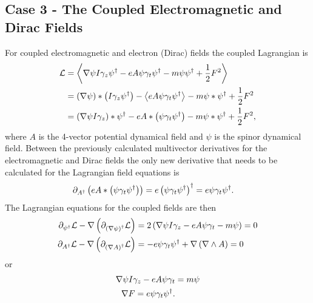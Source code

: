 \subsection{Case 3 - The Coupled Electromagnetic and Dirac Fields}

For coupled electromagnetic and electron (Dirac) fields the coupled Lagrangian is 
\begin{align}
		\mathcal{L} &= \left < {\nabla\psi I\gamma_{z}\psi^{\dagger}-eA\psi\gamma_{t}\psi^{\dagger}-m\psi\psi^{\dagger}+\displaystyle\frac{1}{2} F^{2}} \right >_{} \nonumber \\
		            &= \left ( {\nabla\psi} \right )*\left ( {I\gamma_{z}\psi^{\dagger}} \right )-\left < {eA\psi\gamma_{t}\psi^{\dagger}} \right >_{} - m\psi*\psi^{\dagger} 
		               +\displaystyle\frac{1}{2} F^{2} \\
		            &= \left ( {\nabla\psi I\gamma_{z}} \right )*\psi^{\dagger}-eA*\left ( {\psi\gamma_{t}\psi^{\dagger}} \right ) - m\psi*\psi^{\dagger} +\displaystyle\frac{1}{2} F^{2},
\end{align}
where $A$ is the 4-vector potential dynamical field and $\psi$ is the spinor dynamical field. Between the previously calculated 
multivector derivatives for the electromagnetic and Dirac fields the only new derivative that needs to be calculated for the 
Lagrangian field equations is 
\begin{align}
	\partial_{A^{\dagger}}\left ( {eA*\left ( {\psi\gamma_{t}\psi^{\dagger}} \right )} \right ) &= e\left ( {\psi\gamma_{t}\psi^{\dagger}} \right )^{\dagger} = e\psi\gamma_{t}\psi^{\dagger}.
\end{align}
The Lagrangian equations for the coupled fields are then
\begin{align}
	\partial_{\psi^{\dagger}}\mathcal{L} -\nabla\left ( {\partial_{\left ( {\nabla \psi} \right )^{\dagger}}\mathcal{L}} \right ) &=
		2\left ( {\nabla\psi I\gamma_{z}-eA\psi\gamma_{t}-m\psi} \right ) = 0 \\
	\partial_{A^{\dagger}}\mathcal{L} -\nabla\left ( {\partial_{\left ( {\nabla A} \right )^{\dagger}}\mathcal{L}} \right ) &= 
		-e\psi\gamma_{t}\psi^{\dagger}+\nabla\left ( {\nabla \wedge A} \right ) = 0
\end{align}
or
\begin{align}
	\nabla\psi I\gamma_{z}-eA\psi\gamma_{t} &= m\psi \\
	\nabla F = e\psi\gamma_{t}\psi^{\dagger}.
\end{align}